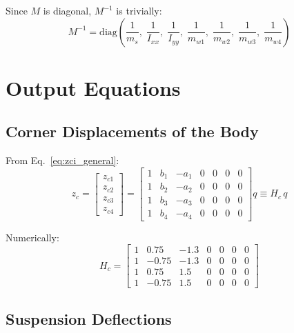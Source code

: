 \documentclass[11pt]{article}
\def\vect#1{#1}%
\newcommand{\vect}[1]{\bm{#1}}
\begin{document}
Since $\vect{M}$ is diagonal, $\vect{M}^{-1}$ is trivially:
\begin{equation}
\vect{M}^{-1} = \mathrm{diag}\!\left(\frac{1}{m_s},\;\frac{1}{I_{xx}},\;\frac{1}{I_{yy}},\;\frac{1}{m_{w1}},\;\frac{1}{m_{w2}},\;\frac{1}{m_{w3}},\;\frac{1}{m_{w4}}\right)
\end{equation}

\section{Output Equations}

\subsection{Corner Displacements of the Body}

From Eq.~\eqref{eq:zci_general}:
\begin{equation}
\vect{z}_c = \begin{bmatrix} z_{c1} \\ z_{c2} \\ z_{c3} \\ z_{c4} \end{bmatrix} = \begin{bmatrix} 1 & b_1 & -a_1 & 0 & 0 & 0 & 0 \\ 1 & b_2 & -a_2 & 0 & 0 & 0 & 0 \\ 1 & b_3 & -a_3 & 0 & 0 & 0 & 0 \\ 1 & b_4 & -a_4 & 0 & 0 & 0 & 0 \end{bmatrix} \vect{q} \equiv \vect{H}_c\,\vect{q}
\end{equation}

Numerically:
\begin{equation}
\vect{H}_c = \begin{bmatrix} 1 & 0.75 & -1.3 & 0 & 0 & 0 & 0 \\ 1 & -0.75 & -1.3 & 0 & 0 & 0 & 0 \\ 1 & 0.75 & 1.5 & 0 & 0 & 0 & 0 \\ 1 & -0.75 & 1.5 & 0 & 0 & 0 & 0 \end{bmatrix}
\end{equation}

\subsection{Suspension Deflections}
\end{document}

